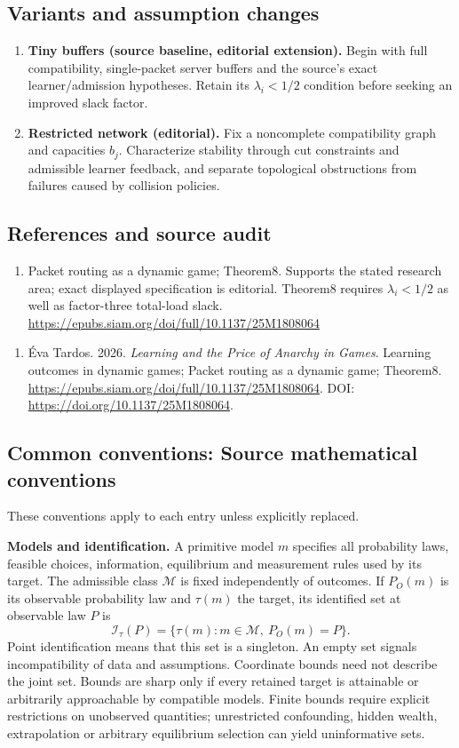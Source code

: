 \documentclass[11pt,a4paper]{article}
\begin{document}
\subsection*{Variants and assumption changes}
\begin{enumerate}
\item \textbf{Tiny buffers (source baseline, editorial extension).} Begin with full compatibility, single-packet server buffers and the source’s exact learner/admission hypotheses. Retain its \(\lambda_i<1/2\) condition before seeking an improved slack factor.
\item \textbf{Restricted network (editorial).} Fix a noncomplete compatibility graph and capacities \(b_j\). Characterize stability through cut constraints and admissible learner feedback, and separate topological obstructions from failures caused by collision policies.
\end{enumerate}
\subsection*{References and source audit}
\begin{enumerate}
\item Packet routing as a dynamic game; Theorem8. Supports the stated research area; exact displayed specification is editorial. Theorem8 requires \(\lambda_i<1/2\) as well as factor-three total-load slack. \url{https://epubs.siam.org/doi/full/10.1137/25M1808064}
\end{enumerate}
\begin{enumerate}\raggedright
\item\hypertarget{definitions:source:30007568:1}{} Éva Tardos. 2026. \emph{Learning and the Price of Anarchy in Games}. Learning outcomes in dynamic games; Packet routing as a dynamic game; Theorem8.
\url{https://epubs.siam.org/doi/full/10.1137/25M1808064}.
DOI: \url{https://doi.org/10.1137/25M1808064}.
\end{enumerate}

\subsection*{Common conventions: Source mathematical conventions}

These conventions apply to each entry unless explicitly replaced.

\textbf{Models and identification.} A primitive model \(m\) specifies all probability laws, feasible choices, information, equilibrium and measurement rules used by its target. The admissible class \(\mathcal M\) is fixed independently of outcomes. If \(P_O(m)\) is its observable probability law and \(\tau(m)\) the target, its identified set at observable law \(P\) is
\[
 \mathcal I_\tau(P)=\{\tau(m):m\in\mathcal M,\ P_O(m)=P\}.
\]
Point identification means that this set is a singleton. An empty set signals incompatibility of data and assumptions. Coordinate bounds need not describe the joint set. Bounds are sharp only if every retained target is attainable or arbitrarily approachable by compatible models. Finite bounds require explicit restrictions on unobserved quantities; unrestricted confounding, hidden wealth, extrapolation or arbitrary equilibrium selection can yield uninformative sets.
\end{document}
